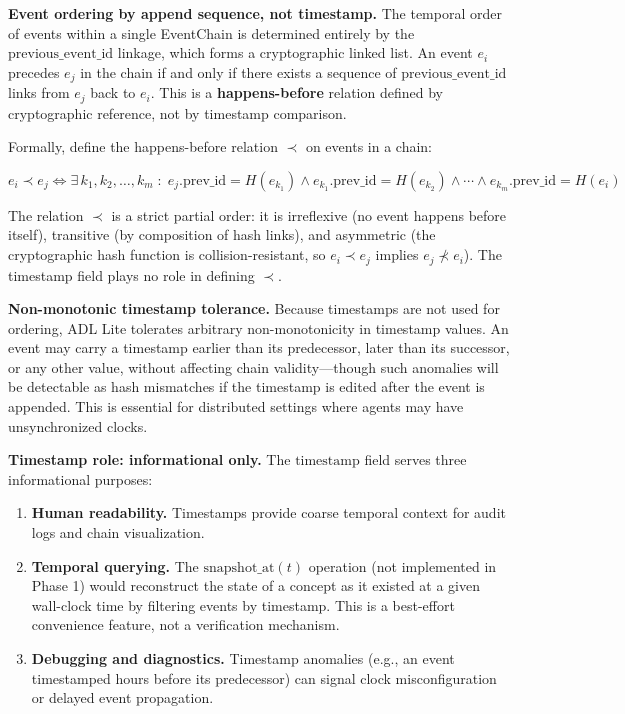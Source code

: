 \textbf{Event ordering by append sequence, not timestamp.} The temporal order of events within a single EventChain is determined entirely by the \(\text{previous\_event\_id}\) linkage, which forms a cryptographic linked list. An event \(e_i\) precedes \(e_j\) in the chain if and only if there exists a sequence of \(\text{previous\_event\_id}\) links from \(e_j\) back to \(e_i\). This is a \textbf{happens-before} relation defined by cryptographic reference, not by timestamp comparison.

Formally, define the happens-before relation \(\prec\) on events in a chain:

\[
e_i \prec e_j \iff \exists\, k_1, k_2, \ldots, k_m \;:\; e_j.\text{prev\_id} = H(e_{k_1}) \land e_{k_1}.\text{prev\_id} = H(e_{k_2}) \land \cdots \land e_{k_m}.\text{prev\_id} = H(e_i)
\]

The relation \(\prec\) is a strict partial order: it is irreflexive (no event happens before itself), transitive (by composition of hash links), and asymmetric (the cryptographic hash function is collision-resistant, so \(e_i \prec e_j\) implies \(e_j \not\prec e_i\)). The timestamp field plays no role in defining \(\prec\).

\textbf{Non-monotonic timestamp tolerance.} Because timestamps are not used for ordering, ADL Lite tolerates arbitrary non-monotonicity in timestamp values. An event may carry a timestamp earlier than its predecessor, later than its successor, or any other value, without affecting chain validity---though such anomalies will be detectable as hash mismatches if the timestamp is edited after the event is appended. This is essential for distributed settings where agents may have unsynchronized clocks.

\textbf{Timestamp role: informational only.} The \(\text{timestamp}\) field serves three informational purposes:

\begin{enumerate}
\def\labelenumi{\arabic{enumi}.}
\tightlist
\item
  \textbf{Human readability.} Timestamps provide coarse temporal context for audit logs and chain visualization.
\item
  \textbf{Temporal querying.} The \(\text{snapshot\_at}(t)\) operation (not implemented in Phase 1) would reconstruct the state of a concept as it existed at a given wall-clock time by filtering events by timestamp. This is a best-effort convenience feature, not a verification mechanism.
\item
  \textbf{Debugging and diagnostics.} Timestamp anomalies (e.g., an event timestamped hours before its predecessor) can signal clock misconfiguration or delayed event propagation.
\end{enumerate}

